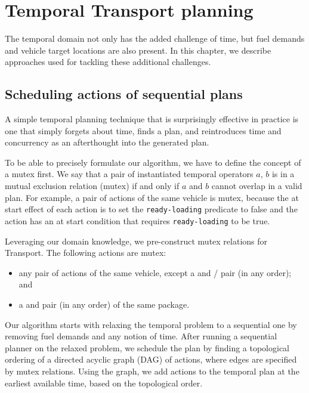 \chapter{Temporal Transport planning}

The temporal domain not only has the added challenge of time,
but fuel demands and vehicle target locations are also present.
In this chapter, we describe approaches used
for tackling these additional challenges.















\section{Scheduling actions of sequential plans}\label{sched}

A simple temporal planning
technique that is surprisingly effective in practice
is one that simply forgets about time,
finds a plan, and reintroduces time and concurrency as an afterthought
into the generated plan.

To be able to precisely formulate our algorithm, we
have to define the concept of a mutex first.
We say that a pair of instantiated temporal operators $a$, $b$
is in a mutual exclusion relation (mutex)
if and only if $a$ and $b$
cannot overlap in a valid plan.
For example, a pair of \pickup{} actions 
of the same vehicle is mutex, because the
at start effect of each action is to 
set the \verb+ready-loading+
predicate to false and the action has an at start
condition that requires \verb+ready-loading+
to be true.

Leveraging our domain knowledge, we pre-construct mutex relations for Transport. The following actions are mutex:
\begin{itemize}
\item any pair of actions
of the same vehicle, except a  and \pickup{}/\drop{} pair (in any order); and
\item a \drop{} and \pickup{} pair (in any order)
of the same package.
\end{itemize}

Our algorithm starts with relaxing the temporal
problem to a sequential one by removing fuel demands
and any notion of time.
After running a sequential planner on the relaxed problem,
we schedule the plan by finding a
topological ordering of a directed acyclic graph (DAG)
of actions, where edges are specified by mutex relations.
Using the graph, we add actions to the temporal plan
at the earliest available time, based on the topological
order.

